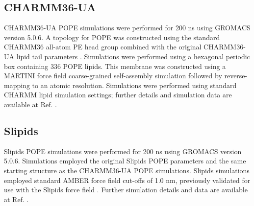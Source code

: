 \documentclass[journal=jpcbfk]{achemso}
\begin{document}
\subsection{CHARMM36-UA}

 CHARMM36-UA POPE simulations were performed for 200 ns using GROMACS version 5.0.6. A topology for POPE was constructed using the standard CHARMM36 all-atom PE head group combined with the original CHARMM36-UA lipid tail parameters \cite{lee14}. Simulations were performed using a hexagonal periodic box containing 336 POPE lipids. This membrane was constructed using a MARTINI force field \cite{marrink07} coarse-grained self-assembly simulation followed by reverse-mapping to an atomic resolution. Simulations were performed using standard CHARMM lipid simulation settings; further details and simulation data are available at Ref. .



\subsection{Slipids}
 Slipids POPE simulations were performed for 200 ns using GROMACS version 5.0.6. Simulations employed the original Slipids POPE parameters \cite{jambeck12b} and the same starting structure as the CHARMM36-UA POPE simulations. Slipids simulations employed standard AMBER force field cut-offs of 1.0 nm, previously validated for use with the Slipids force field \cite{piggot17}. Further simulation details and data are available at Ref. .

\end{document}
